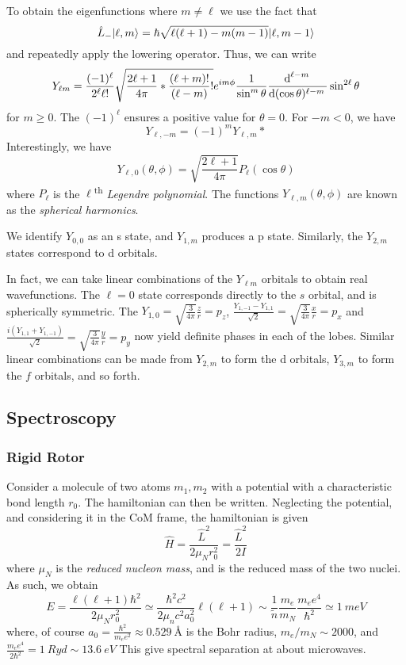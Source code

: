 To obtain the eigenfunctions where \(m\neq \ell\) we use the fact that
\begin{equation}
	\hat L_-\lvert\ell, m\rangle = \hbar\sqrt{\ell(\ell+1)-m(m-1)}\lvert\ell, m-1\rangle
\end{equation}
and repeatedly apply the lowering operator. Thus, we can write
\begin{equation}
Y_{\ell m} = \frac{(-1)^\ell}{2^\ell \ell!}\sqrt{\frac{2\ell+1}{4\pi}*\frac{(\ell+m)!}{(\ell-m)}!} e^{im\phi}\frac{1}{\sin^m\theta}\frac{\d[\ell-m]{}}{\d{(\cos\theta)^{\ell-m}}}\sin^{2\ell}\theta
\end{equation}
for \(m\geq 0\). The \((-1)^\ell\) ensures a positive value for \(\theta=0\). For \(-m<0\), we have
\begin{equation}
	Y_{\ell, -m} = (-1)^{m}Y_{\ell, m}\ast
\end{equation}
Interestingly, we have
\[Y_{\ell, 0}(\theta, \phi) = \sqrt{\frac{2\ell+1}{4\pi}}P_{\ell}(\cos\theta)\]
where \(P_\ell\) is the \(\ell\)\textsuperscript{th} \emph{Legendre polynomial}. The functions \(Y_{\ell, m}(\theta,\phi)\) are known as the \emph{spherical harmonics}.

We identify \(Y_{0,0}\) as an s state, and \(Y_{1,m}\) produces a p state. Similarly, the \(Y_{2,m}\) states correspond to d orbitals.

In fact, we can take linear combinations of the \(Y_{\ell m}\) orbitals to obtain real wavefunctions. The \(\ell = 0\) state corresponds directly to the \(s\) orbital, and is spherically symmetric. The \(Y_{1,0} = \sqrt{\frac{3}{4\pi}}\frac{z}{r} = p_z\), \(\frac{Y_{1,-1}-Y_{1,1}}{\sqrt{2}} = \sqrt{\frac{3}{4\pi}}\frac{x}{r}=p_x\) and \(\frac{i(Y_{1,1}+Y_{1,-1})}{\sqrt{2}} = \sqrt{\frac{3}{4\pi}}\frac{y}{r} = p_y\) now yield definite phases in each of the lobes. Similar linear combinations can be made from \(Y_{2,m}\) to form the d orbitals, \(Y_{3,m}\) to form the \(f\) orbitals, and so forth.

\subsection{Spectroscopy}
\subsubsection{Rigid Rotor}
Consider a molecule of two atoms \(m_1, m_2\) with a potential with a characteristic bond length \(r_0\). The hamiltonian can then be written. Neglecting the potential, and considering it in the CoM frame, the hamiltonian is given
\[\hat H = \frac{\hat L^2}{2\mu_N r_0^2} = \frac{\hat L^2}{2I}\]
where \(\mu_N\) is the \emph{reduced nucleon mass}, and is the reduced mass of the two nuclei. As such, we obtain
\[E = \frac{\ell(\ell+1)\hbar^2}{2\mu_Nr_0^2}\simeq \frac{\hbar^2c^2}{2\mu_nc^2a_0^2}\ell(\ell+1) \sim\frac{1}{\tilde n}\frac{m_e}{m_N}\frac{m_ee^4}{\hbar^2}\simeq\SI{1}{meV} \]
where, of course \(a_0 = \frac{\hbar^2}{m_ee^2}\approx \SI{0.529}{\angstrom}\) is the Bohr radius, \(m_e/m_N\sim 2000\), and \(\frac{m_e e^4}{2\hbar^2} = \SI{1}{Ryd} \sim \SI{13.6}{eV}\)
This give spectral separation at about microwaves.

